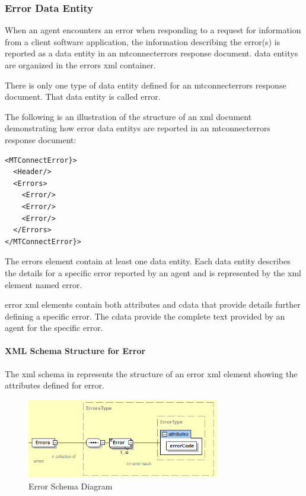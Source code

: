 \documentclass{mtconnect}	%
\begin{document}
\clearpage

\subsubsection{Error Data Entity}

When an \gls{agent} encounters an error when responding to a \gls{request} for information from a client software application, the information describing the error(s) is reported as a \gls{data entity} in an \gls{mtconnecterrors response document}.   \glspl{data entity} are organized in the \gls{errors} \gls{xml} container.

There is only one type of \gls{data entity} defined for an \gls{mtconnecterrors response document}.  That \gls{data entity} is called \gls{error}.

The following is an illustration of the structure of an \gls{xml} document demonstrating how \gls{error} \glspl{data entity} are reported in an \gls{mtconnecterrors response document}:

\begin{lstlisting}[firstnumber=1,escapechar=|,%
caption={Example of Error in MTConnectError}, label={lst:error-in mtconnecterror}]
<MTConnectError}>
  <Header/>
  <Errors>
    <Error/>
    <Error/>
    <Error/>
  </Errors>
</MTConnectError}>    
\end{lstlisting}

The \gls{errors} element \MUST contain at least one \gls{data entity}.  Each \gls{data entity} describes the details for a specific error reported by an \gls{agent} and is represented by the \gls{xml} element named \gls{error}.

\gls{error} \gls{xml} elements \MAY contain both attributes and \gls{cdata} that provide details further defining a specific error.  The \gls{cdata} \MAY provide the complete text provided by an \gls{agent} for the specific error.  

\paragraph{XML Schema Structure for Error}\mbox{}

The \gls{xml schema} in  represents the structure of an \gls{error} \gls{xml} element showing the attributes defined for \gls{error}.

\begin{figure}[ht]
  \centering
  \includegraphics[width=0.75\textwidth]{figures/error-schema-diagram.png}
  \caption{Error Schema Diagram}
  \label{fig:error-schema-diagram}
\end{figure}
\end{document}
